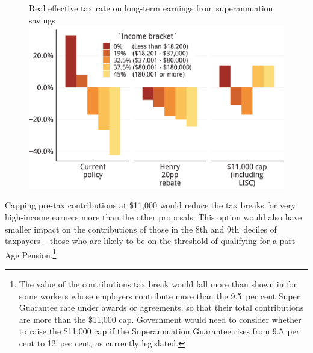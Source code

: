 \begin{figure}
%
{Real effective tax rate on long-term earnings from superannuation savings}\label{fig:SUPER-4-9}
\includegraphics[width=\linewidth]{b5-super-atlas/Figure4-9-1.pdf}
\end{figure}

Capping pre-tax contributions at \$11,000 would reduce the tax breaks for very high-income earners more than the other proposals. This option would also have smaller impact on the contributions of those in the 8th and 9th~deciles of taxpayers – those who are likely to be on the threshold of qualifying for a part Age Pension.\footnote{The value of the contributions tax break would fall more than shown in  for some workers whose employers contribute more than the 9.5~per cent Super Guarantee rate under awards or agreements, so that their total contributions are more than the \$11,000 cap. Government would need to consider whether to raise the \$11,000 cap if the Superannuation Guarantee rises from 9.5~per cent to 12~per cent, as currently legislated.} 

